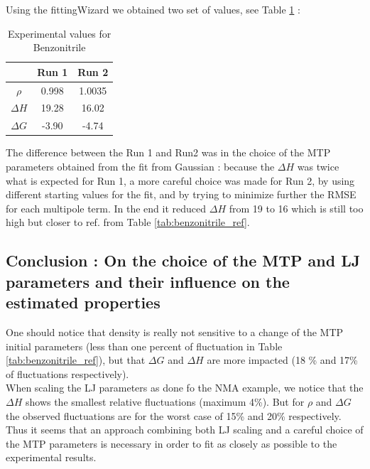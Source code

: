 \documentclass[12pt,a4paper]{article}
\begin{document}
Using the fittingWizard we obtained two set of values, see Table \ref{tab:benzonitrile_new} : \\

\begin{table}[h!]
\centering
\begin{tabular}{|c|c|c|}
\hline  & Run 1 & Run 2 \\ 
\hline $\rho$ & 0.998 & 1.0035 \\ 
\hline $\Delta H$ & 19.28 & 16.02 \\ 
\hline $\Delta G$ & -3.90 & -4.74 \\ 
\hline 
\end{tabular} 
\caption{Experimental values for Benzonitrile}
\label{tab:benzonitrile_new}
\end{table}

The difference between the Run 1 and Run2 was in the choice of the MTP parameters obtained from the 
fit from Gaussian : because the $\Delta H$ was twice what is expected for Run 1, a more careful 
choice was made for Run 2, by using different starting values for the fit, and by trying to 
minimize further the RMSE for each multipole term. In the end it reduced $\Delta H$ from 19 to 16 
which is still too high but closer to ref. from Table \ref{tab:benzonitrile_ref}.\\

\subsection{Conclusion : On the choice of the MTP and LJ parameters and their influence on the 
estimated properties}

One should notice that density is really not sensitive to a change of the MTP initial parameters 
(less than one percent of fluctuation in Table \ref{tab:benzonitrile_ref}), but that $\Delta G$ and 
$\Delta H$ are more impacted (18 \% and 17\% of fluctuations respectively).\\

When scaling the LJ parameters as done fo the NMA example, we notice that the $\Delta H$ shows 
the smallest relative fluctuations (maximum 4\%). But for $\rho$ and $\Delta G$ the observed 
fluctuations are for the worst case of 15\% and 20\% respectively.\\

Thus it seems that an approach combining both LJ scaling and a careful choice of the MTP parameters 
is necessary in order to fit as closely as possible to the experimental results.
\end{document}
